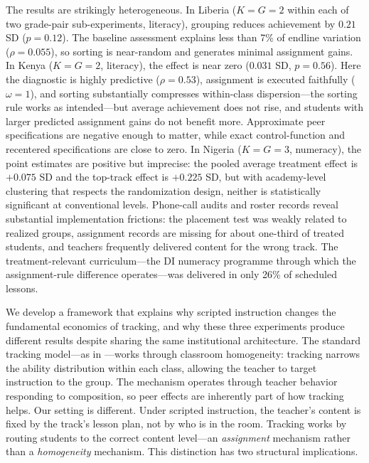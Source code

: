 \documentclass[11pt]{article}
\begin{document}
The results are strikingly heterogeneous. In Liberia ($K = G = 2$ within each of two grade-pair sub-experiments, literacy), grouping reduces achievement by $0.21$ SD ($p = 0.12$). The baseline assessment explains less than 7\% of endline variation ($\rho = 0.055$), so sorting is near-random and generates minimal assignment gains. In Kenya ($K = G = 2$, literacy), the effect is near zero ($0.031$ SD, $p = 0.56$). Here the diagnostic is highly predictive ($\rho = 0.53$), assignment is executed faithfully ($\omega = 1$), and sorting substantially compresses within-class dispersion---the sorting rule works as intended---but average achievement does not rise, and students with larger predicted assignment gains do not benefit more. Approximate peer specifications are negative enough to matter, while exact control-function and recentered specifications are close to zero. In Nigeria ($K = G = 3$, numeracy), the point estimates are positive but imprecise: the pooled average treatment effect is $+0.075$ SD and the top-track effect is $+0.225$ SD, but with academy-level clustering that respects the randomization design, neither is statistically significant at conventional levels. Phone-call audits and roster records reveal substantial implementation frictions: the placement test was weakly related to realized groups, assignment records are missing for about one-third of treated students, and teachers frequently delivered content for the wrong track. The treatment-relevant curriculum---the DI numeracy programme through which the assignment-rule difference operates---was delivered in only 26\% of scheduled lessons.

We develop a framework that explains why scripted instruction changes the fundamental economics of tracking, and why these three experiments produce different results despite sharing the same institutional architecture. The standard tracking model---as in \citet{duflo2011peer}---works through classroom homogeneity: tracking narrows the ability distribution within each class, allowing the teacher to target instruction to the group. The mechanism operates through teacher behavior responding to composition, so peer effects are inherently part of how tracking helps. Our setting is different. Under scripted instruction, the teacher's content is fixed by the track's lesson plan, not by who is in the room. Tracking works by routing students to the correct content level---an \emph{assignment} mechanism rather than a \emph{homogeneity} mechanism. This distinction has two structural implications.
\end{document}
